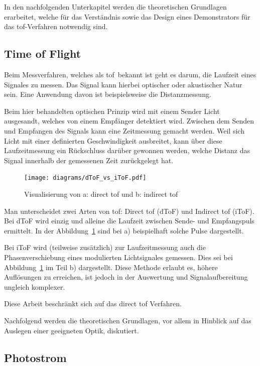 In den nachfolgenden Unterkapitel werden die theoretischen Grundlagen erarbeitet, welche für das Verständnis sowie das
Design eines Demonstrators für das \acrshort{tof}-Verfahren notwendig sind.

\subsection{Time of Flight}

Beim Messverfahren, welches als \dq \acrlong{tof}\dq\ bekannt ist geht es darum, die Laufzeit eines Signales zu messen.
Das Signal kann hierbei optischer oder akustischer Natur sein. Eine Anwendung davon ist beispielsweise die Distanzmessung.

Beim hier behandelten optischen Prinzip wird mit einem Sender Licht ausgesandt, welches von einem Empfänger detektiert wird.
Zwischen dem Senden und Empfangen des Signals kann eine Zeitmessung gemacht werden. Weil sich Licht mit einer definierten
Geschwindigkeit ausbreitet, kann über diese Laufzeitmessung ein Rückschluss darüber gewonnen werden, welche Distanz
das Signal innerhalb der gemessenen Zeit zurückgelegt hat.

\begin{figure}[H]
    \centering
    \texttt{[image: diagrams/dToF\_vs\_iToF.pdf]}
    \caption{Visualisierung von a: direct \acrshort{tof} und b: indirect \acrshort{tof}}\label{fig:dtof_vs_itof}
\end{figure}

Man unterscheidet zwei Arten von \acrshort{tof}: Direct \acrshort{tof} (dToF) und Indirect \acrshort{tof} (iToF). Bei dToF
wird einzig und alleine die Laufzeit zwischen Sende- und Empfangspuls ermittelt. In der Abbildung~\ref{fig:dtof_vs_itof}
sind bei a) beispielhaft solche Pulse dargestellt.

Bei iToF wird (teilweise zusätzlich) zur Laufzeitmessung auch die Phasenverschiebung eines modulierten Lichtsignales gemessen.
Dies sei bei Abbildung~\ref{fig:dtof_vs_itof} im Teil b) dargestellt. Diese Methode erlaubt es, höhere Auflösungen zu
erreichen, ist jedoch in der Auswertung und Signalaufbereitung ungleich komplexer.

Diese Arbeit beschränkt sich auf das direct \acrshort{tof} Verfahren.

Nachfolgend werden die theoretischen Grundlagen, vor allem in Hinblick auf das Auslegen einer geeigneten Optik, diskutiert.

\pagebreak

\subsection{Photostrom}

